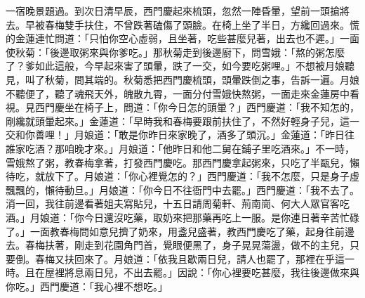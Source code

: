 一宿晚景題過。到次日清早辰，西門慶起來梳頭，忽然一陣昏暈，望前一頭搶將去。早被春梅雙手扶住，不曾跌著磕傷了頭臉。在椅上坐了半日，方纔回過來。慌的金蓮連忙問道：「只怕你空心虛弱，且坐著，吃些甚麼兒著，出去也不遲。」一面使秋菊：「後邊取粥來與你爹吃。」那秋菊走到後邊廚下，問雪娥：「熬的粥怎麼了？爹如此這般，今早起來害了頭暈，跌了一交，如今要吃粥哩。」不想被月娘聽見，叫了秋菊，問其端的。秋菊悉把西門慶梳頭，頭暈跌倒之事，告訴一遍。月娘不聽便了，聽了魂飛天外，魄散九霄，一面分付雪娥快熬粥，一面走來金蓮房中看視。見西門慶坐在椅子上，問道：「你今日怎的頭暈？」西門慶道：「我不知怎的，剛纔就頭暈起來。」金蓮道：「早時我和春梅要跟前扶住了，不然好輕身子兒，這一交和你善哩！」月娘道：「敢是你昨日來家晚了，酒多了頭沉。」金蓮道：「昨日往誰家吃酒？那咱晚才來。」月娘道：「他昨日和他二舅在鋪子里吃酒來。」不一時，雪娥熬了粥，教春梅拿著，打發西門慶吃。那西門慶拿起粥來，只吃了半甌兒，懶待吃，就放下了。月娘道：「你心裡覺怎的？」西門慶道：「我不怎麼，只是身子虛飄飄的，懶待動旦。」月娘道：「你今日不往衙門中去罷。」西門慶道：「我不去了。消一回，我往前邊看著姐夫寫貼兒，十五日請周菊軒、荊南崗、何大人眾官客吃酒。」月娘道：「你今日還沒吃藥，取奶來把那藥再吃上一服。是你連日著辛苦忙碌了。」一面教春梅問如意兒擠了奶來，用盞兒盛著，教西門慶吃了藥，起身往前邊去。春梅扶著，剛走到花園角門首，覺眼便黑了，身子晃晃蕩盪，做不的主兒，只要倒。春梅又扶回來了。月娘道：「依我且歇兩日兒，請人也罷了，那裡在乎這一時。且在屋裡將息兩日兒，不出去罷。」因說：「你心裡要吃甚麼，我往後邊做來與你吃。」西門慶道：「我心裡不想吃。」

